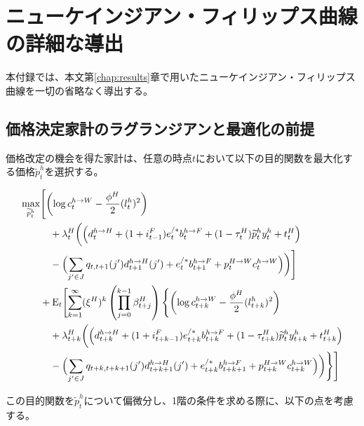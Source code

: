 
\chapter{ニューケインジアン・フィリップス曲線の詳細な導出}
\label{chap:appendix_optimal_price_derivation}

本付録では、本文第\ref{chap:results}章で用いたニューケインジアン・フィリップス曲線を一切の省略なく導出する。

\section{価格決定家計のラグランジアンと最適化の前提}
\label{sec:appendix_optimal_price_derivation_lagrangian}

価格改定の機会を得た家計は、任意の時点\(t\)において以下の目的関数を最大化する価格\(\widetilde{p}_t^h\)を選択する。

\begin{equation}
\begin{aligned}
\max_{\widetilde{p}_t^h}&\Biggl[\left(\log c_t^{h\to W}-\frac{\phi^H}{2}(l_t^h)^2\right) \\
&\quad+\lambda_t^H\biggl(\Bigl(d_t^{h\to H}+(1+i_{t-1}^F)e_t^{/*}b_t^{h\to F}+(1-\tau_t^H)\widetilde{p}_t^hy_t^h+t_t^H\Bigr) \\
&\quad-\Bigl(\sum_{j'\in J}q_{t,t+1}(j')d_{t+1}^{h\to H}(j')+e_t^{/*}b_{t+1}^{h\to F}+p_t^{H\to W}c_t^{h\to W}\Bigr)\biggr)\Biggr] \\
&+\text{E}_t\Biggl[\sum_{k=1}^{\infty}(\xi^H)^k\left(\prod_{j=0}^{k-1}\beta_{t+j}^H\right)\Biggl\{\left(\log c_{t+k}^{h\to W}-\frac{\phi^H}{2}(l_{t+k}^h)^2\right) \\
&\quad+\lambda_{t+k}^H\biggl(\Bigl(d_{t+k}^{h\to H}+(1+i_{t+k-1}^F)e_{t+k}^{/*}b_{t+k}^{h\to F}+(1-\tau_{t+k}^H)\widetilde{p}_t^hy_{t+k}^h+t_{t+k}^H\Bigr) \\
&\quad-\Bigl(\sum_{j'\in J}q_{t+k,t+k+1}(j')d_{t+k+1}^{h\to H}(j')+e_{t+k}^{/*}b_{t+k+1}^{h\to F}+p_{t+k}^{H\to W}c_{t+k}^{h\to W}\Bigr)\biggr)\Biggr\}\Biggr]
\end{aligned}
\label{eq:appendix_optimal_price_derivation_lagrangian_full}
\end{equation}

この目的関数を\(\widetilde{p}_t^h\)について偏微分し、1階の条件を求める際に、以下の点を考慮する。


